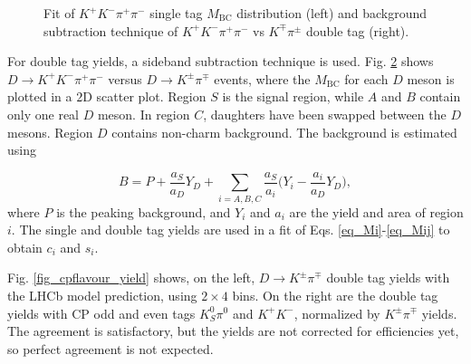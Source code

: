 \documentclass[12pt, a4paper, notitlepage, onecolumn]{article}
\begin{document}
\begin{figure}[H]
\begin{subfigure}{0.5\textwidth}
    \caption{}
    \label{fig_dtyield}
  \end{subfigure}
  \caption{Fit of $K^+K^-\pi^+\pi^-$ single tag $M_\text{BC}$ distribution (left) and background subtraction technique of $K^+K^-\pi^+\pi^-$ vs $K^\mp\pi^\pm$ double tag (right).}
\end{figure}

For double tag yields, a sideband subtraction technique is used. Fig. \ref{fig_dtyield} shows $D\to K^+K^-\pi^+\pi^-$ versus $D\to K^\pm\pi^\mp$ events, where the $M_\text{BC}$ for each $D$ meson is plotted in a $2$D scatter plot. Region $S$ is the signal region, while $A$ and $B$ contain only one real $D$ meson. In region $C$, daughters have been swapped between the $D$ mesons. Region $D$ contains non-charm background. The background is estimated using

\begin{equation*}
  B = P + \frac{a_S}{a_D}Y_D + \sum_{i = A, B, C}\frac{a_S}{a_i}\Big(Y_i - \frac{a_i}{a_D}Y_D\Big),
\end{equation*}
where $P$ is the peaking background, and $Y_i$ and $a_i$ are the yield and area of region $i$. The single and double tag yields are used in a fit of Eqs. \eqref{eq_Mi}-\eqref{eq_Mij} to obtain $c_i$ and $s_i$.

Fig. \ref{fig_cpflavour_yield} shows, on the left, $D\to K^\pm\pi^\mp$ double tag yields with the LHCb model prediction, using $2\times 4$ bins. On the right are the double tag yields with CP odd and even tags $K_S^0\pi^0$ and $K^+K^-$, normalized by $K^\pm\pi^\mp$ yields. The agreement is satisfactory, but the yields are not corrected for efficiencies yet, so perfect agreement is not expected.
\end{document}
